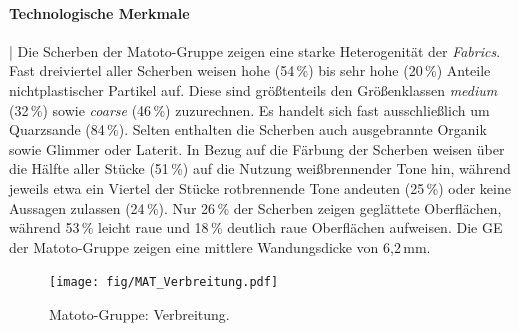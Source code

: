 \paragraph{Technologische Merkmale}\hspace{-.5em}|\hspace{.5em}%
Die Scherben der Matoto-Gruppe zeigen eine starke Heterogenität der \textit{Fabrics}. Fast dreiviertel aller Scherben weisen hohe (54\,\%) bis sehr hohe (20\,\%) Anteile nichtplastischer Partikel auf. Diese sind größtenteils den Größenklassen \textit{medium} (32\,\%) sowie \textit{coarse} (46\,\%) zuzurechnen. Es handelt sich fast ausschließlich um Quarzsande (84\,\%). Selten enthalten die Scherben auch ausgebrannte Organik sowie Glimmer oder Laterit. In Bezug auf die Färbung der Scherben weisen über die Hälfte aller Stücke (51\,\%) auf die Nutzung weißbrennender Tone hin, während jeweils etwa ein Viertel der Stücke rotbrennende Tone andeuten (25\,\%) oder keine Aussagen zulassen (24\,\%). Nur 26\,\% der Scherben zeigen geglättete Oberflächen, während 53\,\% leicht raue und 18\,\% deutlich raue Oberflächen aufweisen. Die GE der Matoto-Gruppe zeigen eine mittlere Wandungsdicke von 6,2\,mm.

\begin{figure}[p]
	\centering
	\texttt{[image: fig/MAT\_Verbreitung.pdf]}
	\caption{Matoto-Gruppe: Verbreitung.}
	\label{fig:MAT_Verbreitung}
\end{figure}

